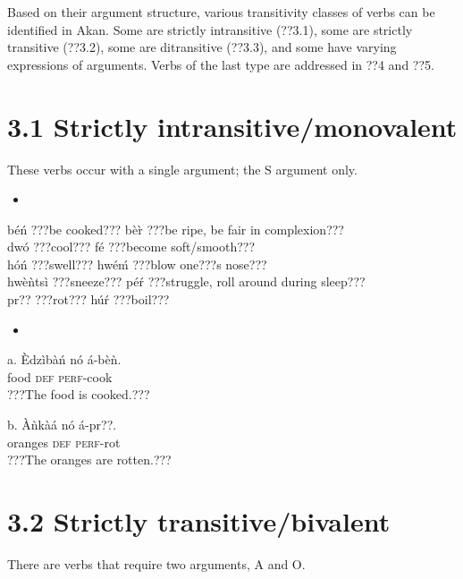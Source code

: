 \documentclass[output=paper]{langsci/langscibook}
\begin{document}
Based on their argument structure, various transitivity classes of verbs can be identified in Akan. Some are strictly intransitive (??3.1), some are strictly transitive (??3.2), some are ditransitive (??3.3), and some have varying expressions of arguments. Verbs of the last type are addressed in ??4 and ??5.

\section{3.1  Strictly intransitive/monovalent}

These verbs occur with a single argument; the S argument only.

\begin{itemize}
\item \end{itemize}
\gll \textup{  }b\'{e}\'{n}   \textup{???be cooked???}     b\`{e}\`{r}   \textup{???be ripe, be fair in complexion???}   \\
\gll dw\'{o}   \textup{???cool??? }      f\'{e}   \textup{???become soft/smooth???}  \\
\gll h\'{o}\'{n}   \textup{???swell???}     hw\'{e}\'{m}   \textup{???blow one???s nose???} \\
\gll hw\`{e}\`{n}ts\`{i}   \textup{???sneeze???}     p\'{e}\'{r}   \textup{???struggle, roll around during sleep???}\\
\gll pr??   \textup{???rot???}       h\'{u}\'{r}   \textup{???boil???} \\
\begin{itemize}
\item \end{itemize}
\gll a.  \`{E}dz\`{i}b\`{a}\'{n}  n\'{o}  \'{a}-b\`{e}\`{n}.\\
       food    \textsc{def}  \textsc{perf}{}-cook\\
\glt   ???The food is cooked.???
\z

\gll  b.  \`{A}\`{n}k\`{a}\'{a}    n\'{o}  \'{a}-pr??.\\
       oranges  \textsc{def}  \textsc{perf}{}-rot\\
\glt   ???The oranges are rotten.???
\z

\section{3.2  Strictly transitive/bivalent}

There are verbs that require two arguments, A and O.
\end{document}
